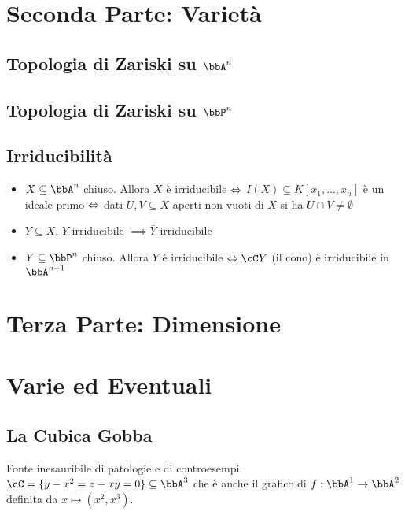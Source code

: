 \documentclass[a4paper,NoNotes,GeneralMath]{stdmdoc}
\begin{document}
	\section*{Seconda Parte: Varietà}
	\subsection{Topologia di Zariski su $\bbA^n$}
	
	\subsection{Topologia di Zariski su $\bbP^n$}
	
	\subsection{Irriducibilità}
	\begin{itemize}
		\item $X \subseteq \bbA^n$ chiuso. Allora $X$ è irriducibile $\Leftrightarrow$ $I(X) \subseteq K[x_1, \ldots, x_n]$ è un ideale primo $\Leftrightarrow$ dati $U, V \subseteq X$ aperti non vuoti di $X$ si ha $U \cap V \neq \emptyset$
		\item $Y \subseteq X$. $Y$ irriducibile $\implies \bar{Y}$ irriducibile
		\item $Y \subseteq \bbP^n$ chiuso. Allora $Y$ è irriducibile $\sse \cC Y$ (il cono) è irriducibile in $\bbA^{n+1}$
	\end{itemize}
	
	
	\section*{Terza Parte: Dimensione}
	
	
	\section*{Varie ed Eventuali}
	\subsection{La Cubica Gobba}
	Fonte inesauribile di patologie e di controesempi. $\cC = \{ y-x^2 = z-xy = 0 \} \subseteq \bbA^3$ che è anche il grafico di $f: \bbA^1 \rar \bbA^2$ definita da $x \mapsto (x^2, x^3)$.
	
\end{document}
